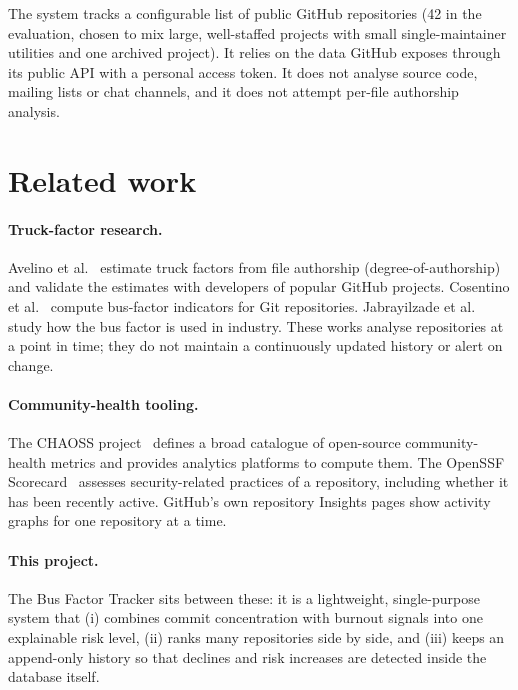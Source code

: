 \documentclass[11pt,a4paper]{report}
\begin{document}
The system tracks a configurable list of public GitHub repositories (42 in the
evaluation, chosen to mix large, well-staffed projects with small
single-maintainer utilities and one archived project). It relies on the data
GitHub exposes through its public API with a personal access token. It does not
analyse source code, mailing lists or chat channels, and it does not attempt
per-file authorship analysis.

\section{Related work}
\label{sec:related}

\paragraph{Truck-factor research.} Avelino et al.~\cite{avelino2016truck}
estimate truck factors from file authorship (degree-of-authorship) and
validate the estimates with developers of popular GitHub projects. Cosentino
et al.~\cite{cosentino2015bus} compute bus-factor indicators for Git
repositories. Jabrayilzade et al.~\cite{jabrayilzade2022bus} study how the bus
factor is used in industry. These works analyse repositories at a point in
time; they do not maintain a continuously updated history or alert on change.

\paragraph{Community-health tooling.} The CHAOSS project~\cite{chaoss} defines a
broad catalogue of open-source community-health metrics and provides
analytics platforms to compute them. The OpenSSF Scorecard~\cite{scorecard}
assesses security-related practices of a repository, including whether it has
been recently active. GitHub's own repository Insights pages show activity
graphs for one repository at a time.

\paragraph{This project.} The Bus Factor Tracker sits between these: it is a
lightweight, single-purpose system that (i) combines commit concentration with
burnout signals into one explainable risk level, (ii) ranks many repositories
side by side, and (iii) keeps an append-only history so that declines and risk
increases are detected inside the database itself.
\end{document}
